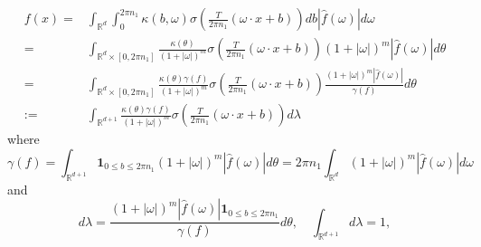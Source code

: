 \begin{equation}
\begin{aligned}
f(x)=&\int_{\mathbb{R}^d}\int_{0}^{2\pi n_1}\kappa(b,\omega)\sigma(\frac{T}{2\pi n_1}(\omega\cdot x+b)) db|\hat{f}(\omega)|d\omega \\
=&\int_{\mathbb{R}^d\times[0,2\pi n_1]}\frac{\kappa(\theta)}{(1+|\omega|)^m}\sigma(\frac{T}{2\pi n_1}(\omega\cdot x+b))(1+|\omega|)^m|\hat{f}(\omega)|d\theta \\
=&\int_{\mathbb{R}^d\times[0,2\pi n_1]}\frac{\kappa(\theta)\gamma(f)}{(1+|\omega|)^m}\sigma(\frac{T}{2\pi n_1}(\omega\cdot x+b))\frac{(1+|\omega|)^m|\hat{f}(\omega)|}{\gamma(f)}d\theta \\
:=&\int_{\mathbb{R}^{d+1}}\frac{\kappa(\theta)\gamma(f)}{(1+|\omega|)^m}\sigma(\frac{T}{2\pi n_1}(\omega\cdot x+b))d\lambda
\end{aligned}
\end{equation}
where
$$
\gamma(f)=\int_{\mathbb{R}^{d+1}}\mathbf{1}_{0\le b\le 2\pi n_1}(1+|\omega|)^m|\hat{f}(\omega)|d\theta =2\pi n_1\int_{\mathbb{R}^d}(1+|\omega|)^m|\hat{f}(\omega)|d\omega
$$
and
$$
d\lambda= \frac{(1+|\omega|)^m|\hat{f}(\omega)|\mathbf{1}_{0\le b\le 2\pi n_1}}{\gamma(f)}d\theta,\quad \int_{\mathbb{R}^{d+1}}d\lambda=1,
$$



